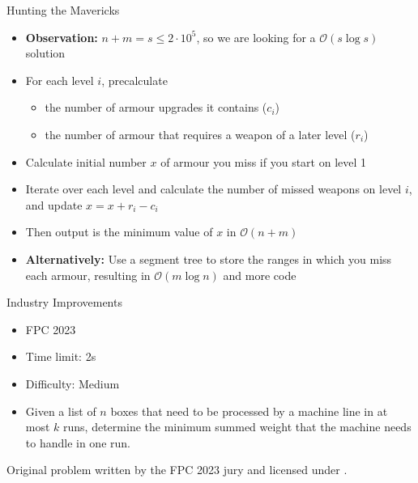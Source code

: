 \documentclass[11pt,pdf, aspectratio=169]{beamer}
\begin{document}
  \begin{frame}{Hunting the Mavericks}
    \begin{itemize}
      \item<1-> \textbf{Observation:} $n+m=s \leq 2\cdot 10^5$, so we are looking for a $\mathcal{O}(s \log s)$ solution
      \item<2-> For each level $i$, precalculate \begin{itemize}
                                                   \item the number of armour upgrades it contains ($c_i$)
                                                   \item the number of armour that requires a weapon of a later level ($r_i$)
      \end{itemize}
      \item<3-> Calculate initial number $x$ of armour you miss if you start on level 1
      \item<4-> Iterate over each level and calculate the number of missed weapons on level $i$, and update $x = x + r_i - c_i$
      \item<4-> Then output is the minimum value of $x$ in $\mathcal{O}(n+m)$
      \item<5-> \textbf{Alternatively:} Use a segment tree to store the ranges in which you miss each armour, resulting in $\mathcal{O}(m\log n)$ and more code
    \end{itemize}
  \end{frame}
  \begin{frame}{Industry Improvements}
    \begin{itemize}
      \item FPC 2023
      \item Time limit: 2s
      \item Difficulty: Medium
      \item Given a list of $n$ boxes that need to be processed by a machine line in at most $k$ runs,
      determine the minimum summed weight that the machine needs to handle in one run.

    \end{itemize}
    Original problem written by the FPC 2023 jury and licensed under \doclicenseLongNameRef.

    \doclicenseImage

  \end{frame}
\end{document}
